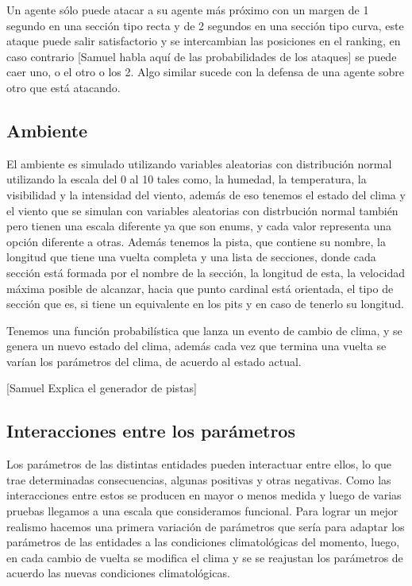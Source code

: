 \documentclass[12pt, letterpaper,spanish]{article}
\theoremstyle{definition}
\theoremstyle{remark}
\begin{document}
		Un agente sólo puede atacar a su agente más próximo con un margen de 1 segundo en una sección tipo recta y de 2 segundos en una sección tipo curva, este ataque puede salir satisfactorio y se intercambian las posiciones en el ranking, en caso contrario [Samuel habla aquí de las probabilidades de los ataques] se puede caer uno, o el otro o los 2. Algo similar sucede con la defensa de una agente sobre otro que está atacando.
	
	\subsection{Ambiente}
		El ambiente es simulado utilizando variables aleatorias con distribución normal utilizando la escala del 0 al 10 tales como, la humedad, la temperatura, la visibilidad y la intensidad del viento, además de eso tenemos el estado del clima y el viento que se simulan con variables aleatorias con distrbución normal también pero tienen una escala diferente ya que son enums, y cada valor representa una  opción diferente a otras. Además tenemos la pista, que contiene su nombre, la longitud que tiene una vuelta completa y una lista de secciones, donde cada sección está formada por el nombre de la sección, la longitud de esta, la velocidad máxima posible de alcanzar, hacia que punto cardinal está orientada, el tipo de sección que es, si tiene un equivalente en los pits y en caso de tenerlo su longitud.
		
		Tenemos una función probabilística que lanza un evento de cambio de clima, y se genera un nuevo estado del clima, además cada vez que termina una vuelta se varían los parámetros del clima, de acuerdo al estado actual.
		
		[Samuel Explica el generador de pistas]
	
	\subsection{Interacciones entre los parámetros}
		Los parámetros de las distintas entidades pueden interactuar entre ellos, lo que trae determinadas consecuencias, algunas positivas y otras negativas. Como las interacciones entre estos se producen en mayor o menos medida y luego de varias pruebas llegamos a una escala que consideramos funcional. Para lograr un mejor realismo hacemos una primera variación de parámetros que sería para adaptar los parámetros de las entidades a las condiciones climatológicas del momento, luego, en cada cambio de vuelta se modifica el clima y se se reajustan los parámetros de acuerdo las nuevas condiciones climatológicas.
\end{document}
